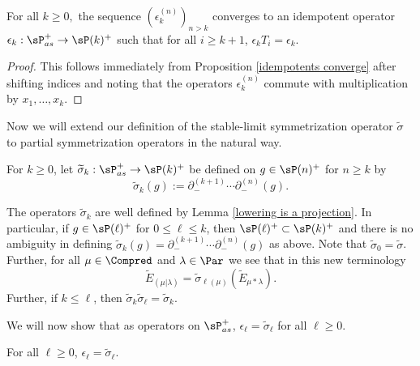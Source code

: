 \begin{coro}\label{partial idempotents converge}
    For all $k \geq 0,$ the sequence $(\epsilon^{(n)}_k)_{n>k}$ converges to an idempotent operator $\epsilon_k: \sP_{as}^{+} \rightarrow \sP(k)^{+}$ such that for all $ i \geq k+1$, $\epsilon_k T_i = \epsilon_k$.
\end{coro}

\begin{proof}
    This follows immediately from Proposition \ref{idempotents converge} after shifting indices and noting that the operators $\epsilon^{(n)}_k$ commute with multiplication by $x_1,\ldots, x_k$.
\end{proof}

Now we will extend our definition of the stable-limit symmetrization operator $\widetilde{\sigma}$ to partial symmetrization operators in the natural way.

\begin{defi}\label{defn 12}
    For $k \geq 0$, let $\widetilde{\sigma}_k: \sP_{as}^{+} \rightarrow \sP(k)^{+}$ be defined on $g \in \sP(n)^{+}$ for $n \geq k$ by 
    \begin{equation}
        \widetilde{\sigma}_k(g):= \partial_{-}^{(k+1)}\cdots \partial_{-}^{(n)}(g).
    \end{equation}
\end{defi}

\begin{rema}
    The operators $\widetilde{\sigma}_k$ are well defined by Lemma \ref{lowering is a projection}. In particular, if $g \in \sP(\ell)^{+}$ for $0 \leq \ell \leq k$, then $\sP(\ell)^{+} \subset \sP(k)^{+}$ and there is no ambiguity in defining $\widetilde{\sigma}_k(g) = \partial_{-}^{(k+1)}\cdots \partial_{-}^{(n)}(g)$ as above. Note that $\widetilde{\sigma}_0 = \widetilde{\sigma}$. Further, for all $\mu \in \Compred$ and $\lambda \in \Par$ we see that in this new terminology 
    $$\widetilde{E}_{(\mu|\lambda)} = \widetilde{\sigma}_{\ell(\mu)}(\widetilde{E}_{\mu*\lambda}). $$ Further, if $k \leq \ell$, then $\widetilde{\sigma}_k\widetilde{\sigma}_{\ell} = \widetilde{\sigma}_k.$
\end{rema}

We will now show that as operators on $\sP_{as}^{+}$, $\epsilon_{\ell} = \widetilde{\sigma}_{\ell}$ for all ${\ell} \geq 0$.

\begin{prop}\label{idempotent = HL}
    For all $\ell \geq 0$, $\epsilon_{\ell} = \widetilde{\sigma}_{\ell} .$
\end{prop}


